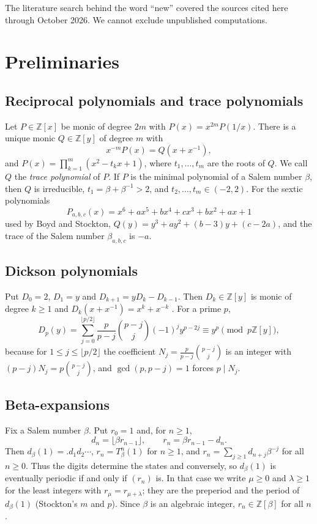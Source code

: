 \documentclass[11pt]{amsart}
\theoremstyle{definition}
\theoremstyle{remark}
\newcommand{\Z}{\mathbb Z}
\begin{document}
The literature search behind the word ``new'' covered the sources cited here through October 2026. We cannot exclude unpublished computations.

\section{Preliminaries}

\subsection{Reciprocal polynomials and trace polynomials}
Let $P\in\Z[x]$ be monic of degree $2m$ with $P(x)=x^{2m}P(1/x)$. There is a unique monic $Q\in\Z[y]$ of degree $m$ with
\[
x^{-m}P(x)=Q(x+x^{-1}),
\]
and $P(x)=\prod_{k=1}^m(x^2-t_kx+1)$, where $t_1,\dots,t_m$ are the roots of $Q$. We call $Q$ the \emph{trace polynomial} of $P$. If $P$ is the minimal polynomial of a Salem number $\beta$, then $Q$ is irreducible, $t_1=\beta+\beta^{-1}>2$, and $t_2,\dots,t_m\in(-2,2)$. For the sextic polynomials
\[
P_{a,b,c}(x)=x^6+ax^5+bx^4+cx^3+bx^2+ax+1
\]
used by Boyd and Stockton, $Q(y)=y^3+ay^2+(b-3)y+(c-2a)$, and the trace of the Salem number $\beta_{a,b,c}$ is $-a$.

\subsection{Dickson polynomials}
Put $D_0=2$, $D_1=y$ and $D_{k+1}=yD_k-D_{k-1}$. Then $D_k\in\Z[y]$ is monic of degree $k\ge1$ and $D_k(x+x^{-1})=x^k+x^{-k}$ \cite{LMT}. For a prime $p$,
\[
D_p(y)=\sum_{j=0}^{\lfloor p/2\rfloor}\frac{p}{p-j}\binom{p-j}{j}(-1)^jy^{p-2j}\equiv y^p\pmod{p\Z[y]},
\]
because for $1\le j\le\lfloor p/2\rfloor$ the coefficient $N_j=\frac{p}{p-j}\binom{p-j}{j}$ is an integer \cite{LMT} with $(p-j)N_j=p\binom{p-j}{j}$, and $\gcd(p,p-j)=1$ forces $p\mid N_j$.

\subsection{Beta-expansions}
Fix a Salem number $\beta$. Put $r_0=1$ and, for $n\ge1$,
\[
d_n=\lfloor\beta r_{n-1}\rfloor,\qquad r_n=\beta r_{n-1}-d_n .
\]
Then $d_\beta(1)=.d_1d_2\cdots$, $r_n=T_\beta^n(1)$ for $n\ge1$, and $r_n=\sum_{j\ge1}d_{n+j}\beta^{-j}$ for all $n\ge0$. Thus the digits determine the states and conversely, so $d_\beta(1)$ is eventually periodic if and only if $(r_n)$ is. In that case we write $\mu\ge0$ and $\lambda\ge1$ for the least integers with $r_\mu=r_{\mu+\lambda}$; they are the preperiod and the period of $d_\beta(1)$ (Stockton's $m$ and $p$). Since $\beta$ is an algebraic integer, $r_n\in\Z[\beta]$ for all $n$.
\end{document}
